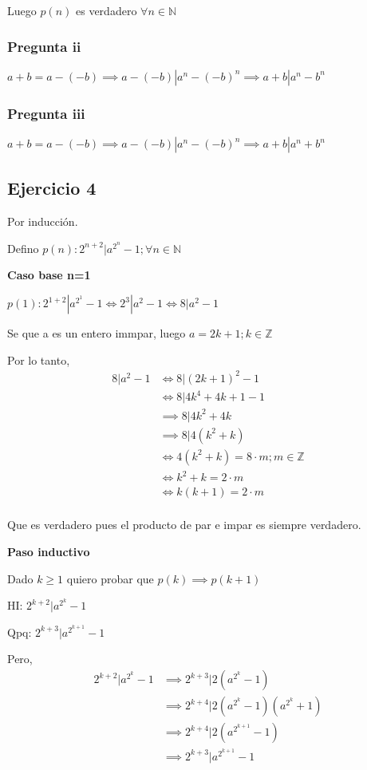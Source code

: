 Luego $p(n)$ es verdadero $ \forall n \in \mathbb{N} $

\subsubsection{Pregunta ii}
$ a+b = a - (-b) \implies a - (-b) | a^n - (-b)^n \implies a+b | a^n - b^n$

\subsubsection{Pregunta iii}
$ a+b = a-(-b) \implies a-(-b)|a^n - (-b)^n \implies a+b | a^n + b^n $

\subsection{Ejercicio 4}
Por inducción.

Defino $ p(n): 2^{n+2}|a^{2^n}-1; \forall n \in \mathbb{N} $

\textbf{Caso base n=1}

$ p(1): 2^{1+2}|a^{2^1}-1 \iff 2^3 | a^{2}-1 \iff 8 | a^{2}-1 $

Se que a es un entero immpar, luego $ a = 2k + 1; k \in \mathbb{Z} $

Por lo tanto,
\begin{align*}
    8 | a^{2}-1 &\iff 8 | (2k + 1)^{2}-1 \\
    &\iff 8 | 4k^4 + 4k + 1 - 1 \\
    &\implies 8 | 4k^2 + 4k \\
    &\implies 8 | 4(k^2 + k) \\
    &\iff 4(k^2 + k) = 8\cdot m; m \in \mathbb{Z} \\
    &\iff k^2 + k = 2\cdot m \\
    &\iff k(k+1) = 2\cdot m \\
\end{align*}

Que es verdadero pues el producto de par e impar es siempre verdadero.

\textbf{Paso inductivo}

Dado $ k \geq 1 $ quiero probar que $ p(k) \implies p(k+1) $

HI: $ 2^{k+2}|a^{2^k}-1 $

Qpq: $ 2^{k+3}|a^{2^{k+1}}-1 $

Pero,
\begin{align*}
    2^{k+2} | a^{2^k}-1 &\implies 2^{k+3} | 2(a^{2^k}-1) \\
    &\implies 2^{k+4} | 2(a^{2^k}-1)(a^{2^k}+1) \\
    &\implies 2^{k+4} | 2(a^{2^{k+1}}-1) \\
    &\implies 2^{k+3} | a^{2^{k+1}}-1 \\
\end{align*}

